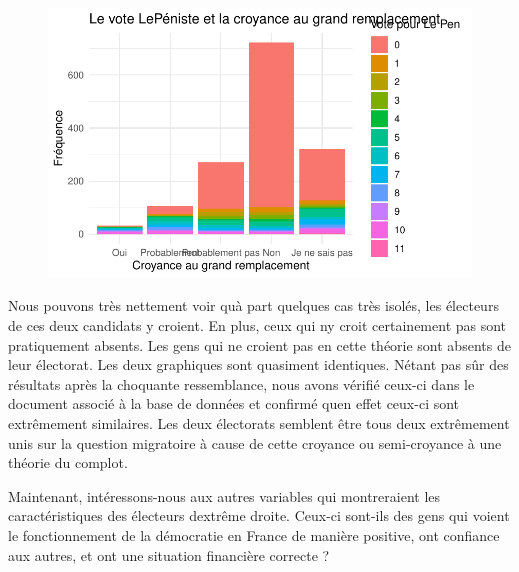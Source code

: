 \documentclass[
  letterpaper,
  DIV=11,
  numbers=noendperiod]{scrartcl}
\begin{document}
\begin{figure}[H]

{\centering \includegraphics{travail_session_Akyildiz_files/figure-pdf/unnamed-chunk-5-1.pdf}

}

\end{figure}

Nous pouvons très nettement voir qu\textquotesingle à part quelques cas
très isolés, les électeurs de ces deux candidats y croient. En plus,
ceux qui n\textquotesingle y croit certainement pas sont pratiquement
absents. Les gens qui ne croient pas en cette théorie sont absents de
leur électorat. Les deux graphiques sont quasiment identiques.
N\textquotesingle étant pas sûr des résultats après la choquante
ressemblance, nous avons vérifié ceux-ci dans le document associé à la
base de données et confirmé qu\textquotesingle en effet ceux-ci sont
extrêmement similaires. Les deux électorats semblent être tous deux
extrêmement unis sur la question migratoire à cause de cette croyance ou
semi-croyance à une théorie du complot.

Maintenant, intéressons-nous aux autres variables qui montreraient les
caractéristiques des électeurs d\textquotesingle extrême droite. Ceux-ci
sont-ils des gens qui voient le fonctionnement de la démocratie en
France de manière positive, ont confiance aux autres, et ont une
situation financière correcte ?
\end{document}
